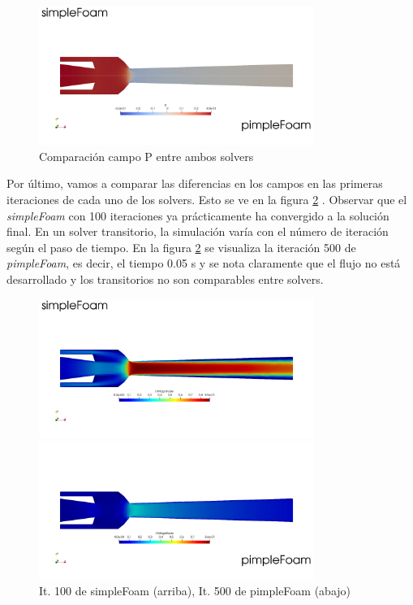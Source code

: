 \documentclass[oneside,a4paper,spanish,links]{amca}
\begin{document}
\newpage
\begin{figure}[htb]
	\centerline{\includegraphics[width=0.8\textwidth]{Figuras/06_pimple_simple_p.png}} 
	\caption{Comparación campo P entre ambos solvers} \label{fg:06_pimple_simple_p}
\end{figure}

Por último, vamos a comparar las diferencias en los campos en las primeras iteraciones de cada uno de los solvers.
Esto se ve en la figura \ref{fg:06_ps_transitorio} . Observar que el \textit{simpleFoam} con 100 iteraciones ya prácticamente ha convergido a la solución final. En un solver transitorio, la simulación varía con el número de iteración según el paso de tiempo. En la figura \ref{fg:06_ps_transitorio} se visualiza la iteración 500 de \textit{pimpleFoam}, es decir, el tiempo 0.05 s y se nota claramente que el flujo no está desarrollado y los transitorios no son comparables entre solvers.

\newpage
\begin{figure}[htb]
	\centerline{\includegraphics[width=0.8\textwidth]{Figuras/06_simple_100.png}} 
	\centerline{\includegraphics[width=0.8\textwidth]{Figuras/06_pimple_005.png}} 
	\caption{It. 100 de simpleFoam (arriba), It. 500 de pimpleFoam (abajo)} \label{fg:06_ps_transitorio}
\end{figure}
\end{document}
